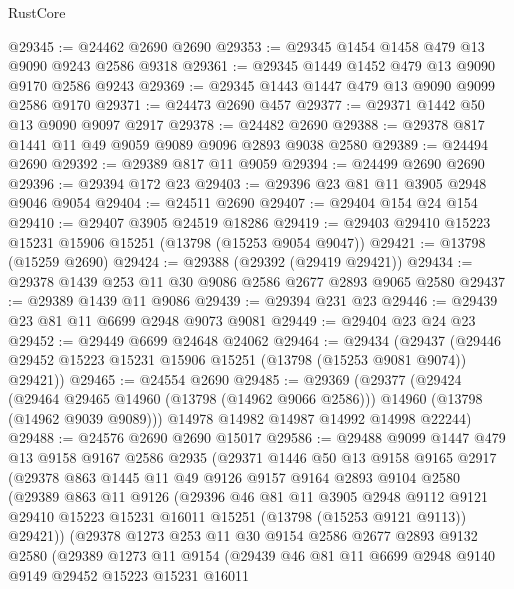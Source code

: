\begin{lexlean}{RustCore}
\begin{coremodule}
@29345 := @24462 @2690 @2690
@29353 := @29345 @1454 @1458 @479 @13 @9090 @9243 @2586 @9318
@29361 := @29345 @1449 @1452 @479 @13 @9090 @9170 @2586 @9243
@29369 := @29345 @1443 @1447 @479 @13 @9090 @9099 @2586 @9170
@29371 := @24473 @2690 @457
@29377 := @29371 @1442 @50 @13 @9090 @9097 @2917
@29378 := @24482 @2690
@29388 := @29378 @817 @1441 @11 @49 @9059 @9089 @9096 @2893 @9038 @2580
@29389 := @24494 @2690
@29392 := @29389 @817 @11 @9059
@29394 := @24499 @2690 @2690
@29396 := @29394 @172 @23
@29403 := @29396 @23 @81 @11 @3905 @2948 @9046 @9054
@29404 := @24511 @2690
@29407 := @29404 @154 @24 @154
@29410 := @29407 @3905 @24519 @18286
@29419 := @29403 @29410 @15223 @15231 @15906 @15251 (@13798 (@15253 @9054 @9047))
@29421 := @13798 (@15259 @2690)
@29424 := @29388 (@29392 (@29419 @29421))
@29434 := @29378 @1439 @253 @11 @30 @9086 @2586 @2677 @2893 @9065 @2580
@29437 := @29389 @1439 @11 @9086
@29439 := @29394 @231 @23
@29446 := @29439 @23 @81 @11 @6699 @2948 @9073 @9081
@29449 := @29404 @23 @24 @23
@29452 := @29449 @6699 @24648 @24062
@29464 := @29434
    (@29437 (@29446 @29452 @15223 @15231 @15906 @15251 (@13798 (@15253 @9081 @9074)) @29421))
@29465 := @24554 @2690
@29485 := @29369
    (@29377
      (@29424
        (@29464 @29465 @14960 (@13798 (@14962 @9066 @2586)))
        @14960
        (@13798 (@14962 @9039 @9089)))
      @14978
      @14982
      @14987
      @14992
      @14998
      @22244)
@29488 := @24576 @2690 @2690 @15017
@29586 := @29488
    @9099
    @1447
    @479
    @13
    @9158
    @9167
    @2586
    @2935
    (@29371
      @1446
      @50
      @13
      @9158
      @9165
      @2917
      (@29378
        @863
        @1445
        @11
        @49
        @9126
        @9157
        @9164
        @2893
        @9104
        @2580
        (@29389
          @863
          @11
          @9126
          (@29396
            @46
            @81
            @11
            @3905
            @2948
            @9112
            @9121
            @29410
            @15223
            @15231
            @16011
            @15251
            (@13798 (@15253 @9121 @9113))
            @29421))
        (@29378
          @1273
          @253
          @11
          @30
          @9154
          @2586
          @2677
          @2893
          @9132
          @2580
          (@29389
            @1273
            @11
            @9154
            (@29439
              @46
              @81
              @11
              @6699
              @2948
              @9140
              @9149
              @29452
              @15223
              @15231
              @16011

\end{coremodule}
\end{lexlean}
